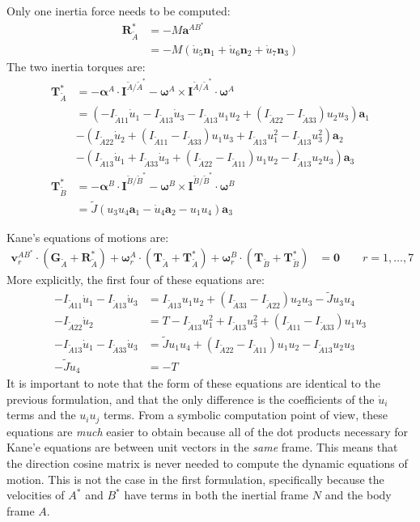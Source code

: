 \documentclass[letterpaper,11pt]{article}
\newcommand{\bs}[1]{ \boldsymbol{ #1 } }
\begin{document}
Only one inertia force needs to be computed:
\begin{align*}
  \bs{R}^*_{\tilde{A}} & = -M\bs{a}^{AB^*}\\
  & = -M\left(\dot{u}_5 \bs{n}_1 + \dot{u}_6 \bs{n}_2 + \dot{u}_7
  \bs{n}_3\right)
\end{align*}
The two inertia torques are:
\begin{align*}
  \bs{T}^*_{\tilde{A}} & = - \bs{\alpha}^A \cdot \bs{I}^{\tilde{A}/\tilde{A}^*}
  - \bs{\omega}^A \times \bs{I}^{\tilde{A}/\tilde{A}^*} \cdot \bs{\omega}^A
  \\
  & =
  (-I_{\tilde{A}11}\dot{u}_1 - I_{\tilde{A}13}\dot{u}_3
  - I_{\tilde{A}13}u_1u_2 + (I_{\tilde{A}22} - I_{\tilde{A}33})u_2u_3 )\bs{a}_1
  \\
  & - (I_{\tilde{A}22}\dot{u}_2 + (I_{\tilde{A}11} - I_{\tilde{A}33})u_1u_3
  + I_{\tilde{A}13}u_1^2 - I_{\tilde{A}13}u_3^2)\bs{a}_2
  \\
  & - (I_{\tilde{A}13}\dot{u}_1 + I_{\tilde{A}33}\dot{u}_3 + (I_{\tilde{A}22}
  - I_{\tilde{A}11})u_1u_2 - I_{\tilde{A}13}u_2u_3)\bs{a}_3
  \\
  \bs{T}^*_{\tilde{B}} & = -\bs{\alpha}^B \cdot \bs{I}^{\tilde{B}/\tilde{B}^*}
  - \bs{\omega}^B \times \bs{I}^{\tilde{B}/\tilde{B}^*} \cdot \bs{\omega}^B \\
  & = \tilde{J}(u_3u_4\bs{a}_1 - \dot{u}_4\bs{a}_2 - u_1u_4)\bs{a}_3
\end{align*}

Kane's equations of motions are:
\begin{align*}
  \bs{v}^{AB^*}_r \cdot (\bs{G}_{\tilde{A}} + \bs{R}^*_{\tilde{A}}) +
  \bs{\omega}^A_r \cdot (\bs{T}_{\tilde{A}} + \bs{T}^*_{\tilde{A}}) +
  \bs{\omega}^B_r \cdot (\bs{T}_{\tilde{B}} + \bs{T}^*_{\tilde{B}}) & = \bs{0} \qquad r = 1,\dots,7
\end{align*}
More explicitly, the first four of these equations are:
\begin{align*}
  -I_{\tilde{A}11}\dot{u}_1 - I_{\tilde{A}13}\dot{u}_3 &= I_{\tilde{A}13}u_1u_2
  + (I_{\tilde{A}33} - I_{\tilde{A}22})u_2u_3 - \tilde{J}u_3u_4
  \\
  -I_{\tilde{A}22}\dot{u}_2 &=  T - I_{\tilde{A}13}u_1^2 + I_{\tilde{A}13}u_3^2
  + (I_{\tilde{A}11} - I_{\tilde{A}33})u_1u_3
 \\
 -I_{\tilde{A}13}\dot{u}_1 - I_{\tilde{A}33}\dot{u}_3 & =  \tilde{J}u_1u_4 +
 (I_{\tilde{A}22} - I_{\tilde{A}11})u_1u_2 - I_{\tilde{A}13}u_2u_3
 \\
 -\tilde{J}\dot{u}_4 &= -T
\end{align*}
It is important to note that the form of these equations are identical to the
previous formulation, and that the only difference is the coefficients of the
$\dot{u}_i$ terms and the $u_iu_j$ terms.  From a symbolic computation point of
view, these equations are {\it{much}} easier to obtain because all of the dot
products necessary for Kane'e equations are between unit vectors in the
{\it{same}} frame.  This means that the direction cosine matrix is never
needed to compute the dynamic equations of motion.  This is not the case in the
first formulation, specifically because the velocities of $A^*$ and $B^*$ have
terms in both the inertial frame $N$ and the body frame $A$.
\end{document}
